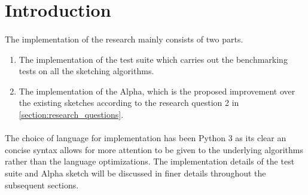 \section{Introduction}

\paragraph{}
The implementation of the research mainly consists of two parts.

\begin{enumerate}
    \item The implementation of the test suite which carries out the benchmarking tests on all the sketching algorithms.
    \item The implementation of the Alpha, which is the proposed improvement over the existing sketches according to the research question 2 in \autoref{section:research_questions}.
\end{enumerate}

\paragraph{}
The choice of language for implementation has been Python 3 as its clear an concise syntax allows for more attention to be given to the underlying algorithms rather than the language optimizations. The implementation details of the test suite and Alpha sketch will be discussed in finer details throughout the subsequent sections.